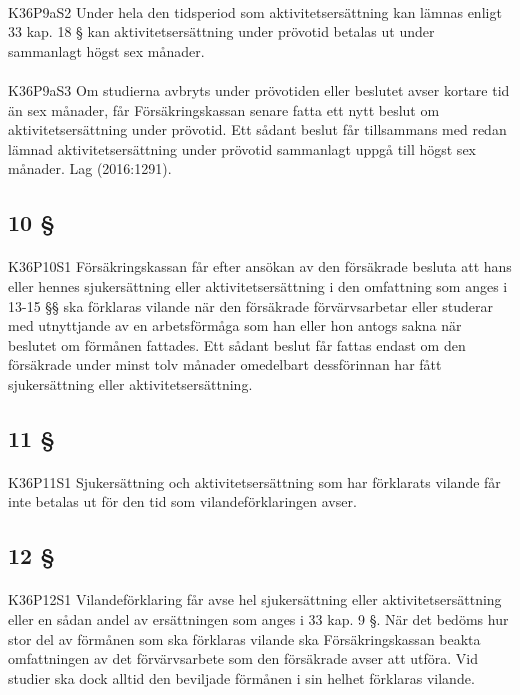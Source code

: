 \documentclass[a4paper,notitlepage,openany,10pt]{book}
\begin{document}
\paragraph*{}
{\tiny K36P9aS2}
Under hela den tidsperiod som aktivitetsersättning kan lämnas enligt 33 kap. 18 § kan aktivitetsersättning under prövotid betalas ut under sammanlagt högst sex månader.
\paragraph*{}
{\tiny K36P9aS3}
Om studierna avbryts under prövotiden eller beslutet avser kortare tid än sex månader, får Försäkringskassan senare fatta ett nytt beslut om aktivitetsersättning under prövotid. Ett sådant beslut får tillsammans med redan lämnad aktivitetsersättning under prövotid sammanlagt uppgå till högst sex månader.
Lag (2016:1291).
\subsection*{10 §}
\paragraph*{}
{\tiny K36P10S1}
Försäkringskassan får efter ansökan av den försäkrade besluta att hans eller hennes sjukersättning eller aktivitetsersättning i den omfattning som anges i 13-15 §§ ska förklaras vilande när den försäkrade förvärvsarbetar eller studerar med utnyttjande av en arbetsförmåga som han eller hon antogs sakna när beslutet om förmånen fattades. Ett sådant beslut får fattas endast om den försäkrade under minst tolv månader omedelbart dessförinnan har fått sjukersättning eller aktivitetsersättning.
\subsection*{11 §}
\paragraph*{}
{\tiny K36P11S1}
Sjukersättning och aktivitetsersättning som har förklarats vilande får inte betalas ut för den tid som vilandeförklaringen avser.
\subsection*{12 §}
\paragraph*{}
{\tiny K36P12S1}
Vilandeförklaring får avse hel sjukersättning eller aktivitetsersättning eller en sådan andel av ersättningen som anges i 33 kap. 9 §. När det bedöms hur stor del av förmånen som ska förklaras vilande ska Försäkringskassan beakta omfattningen av det förvärvsarbete som den försäkrade avser att utföra. Vid studier ska dock alltid den beviljade förmånen i sin helhet förklaras vilande.
\end{document}
